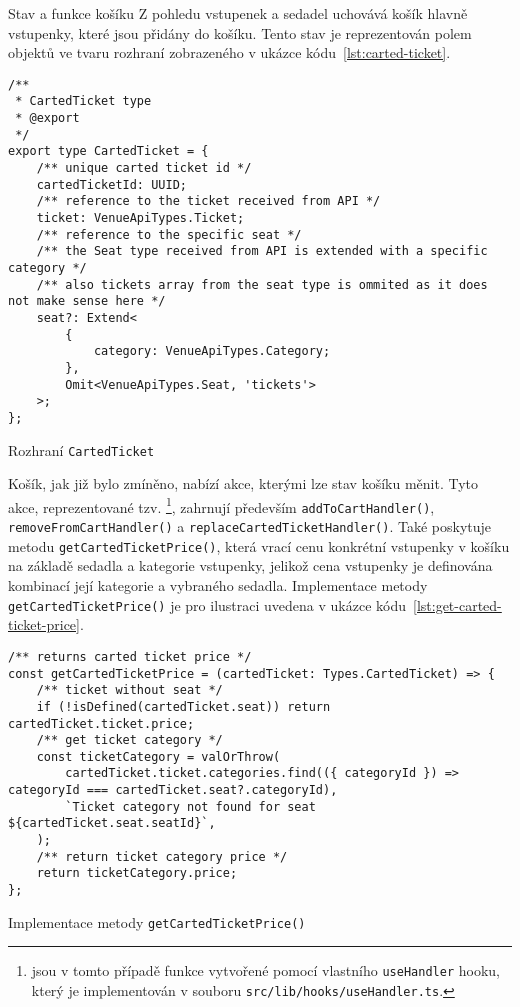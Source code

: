 \begin{subsection}{Stav a funkce košíku}
    \label{subsec:implementace-kosik-stav}
    Z pohledu vstupenek a sedadel uchovává košík hlavně vstupenky, které jsou přidány do košíku.
    Tento stav je reprezentován polem objektů ve tvaru rozhraní zobrazeného v ukázce kódu~\ref{lst:carted-ticket}.

    \begin{listing}[H]
        \begin{verbatim}
/**
 * CartedTicket type
 * @export
 */
export type CartedTicket = {
	/** unique carted ticket id */
	cartedTicketId: UUID;
	/** reference to the ticket received from API */
	ticket: VenueApiTypes.Ticket;
	/** reference to the specific seat */
	/** the Seat type received from API is extended with a specific category */
	/** also tickets array from the seat type is ommited as it does not make sense here */
	seat?: Extend<
		{
			category: VenueApiTypes.Category;
		},
		Omit<VenueApiTypes.Seat, 'tickets'>
	>;
};
        \end{verbatim}
        \caption{Rozhraní \texttt{CartedTicket}}
        \label{lst:carted-ticket}
    \end{listing}

    Košík, jak již bylo zmíněno, nabízí akce, kterými lze stav košíku měnit.
    Tyto akce, reprezentované tzv. \footnote{ jsou v tomto případě funkce vytvořené pomocí vlastního \texttt{useHandler} hooku, který je implementován v souboru \texttt{src/lib/hooks/useHandler.ts}.}, zahrnují především \texttt{addToCartHandler()}, \texttt{removeFromCartHandler()} a \texttt{replaceCartedTicketHandler()}.
    Také poskytuje metodu \texttt{getCartedTicketPrice()}, která vrací cenu konkrétní vstupenky v košíku na základě sedadla a kategorie vstupenky, jelikož cena vstupenky je definována kombinací její kategorie a vybraného sedadla.
    Implementace metody \texttt{getCartedTicketPrice()} je pro ilustraci uvedena v ukázce kódu~\ref{lst:get-carted-ticket-price}.

    \begin{listing}[H]
        \begin{verbatim}
/** returns carted ticket price */
const getCartedTicketPrice = (cartedTicket: Types.CartedTicket) => {
	/** ticket without seat */
	if (!isDefined(cartedTicket.seat)) return cartedTicket.ticket.price;
	/** get ticket category */
	const ticketCategory = valOrThrow(
		cartedTicket.ticket.categories.find(({ categoryId }) => categoryId === cartedTicket.seat?.categoryId),
		`Ticket category not found for seat ${cartedTicket.seat.seatId}`,
	);
	/** return ticket category price */
	return ticketCategory.price;
};
        \end{verbatim}
        \caption{Implementace metody \texttt{getCartedTicketPrice()}}
        \label{lst:get-carted-ticket-price}
    \end{listing}


\end{subsection}
